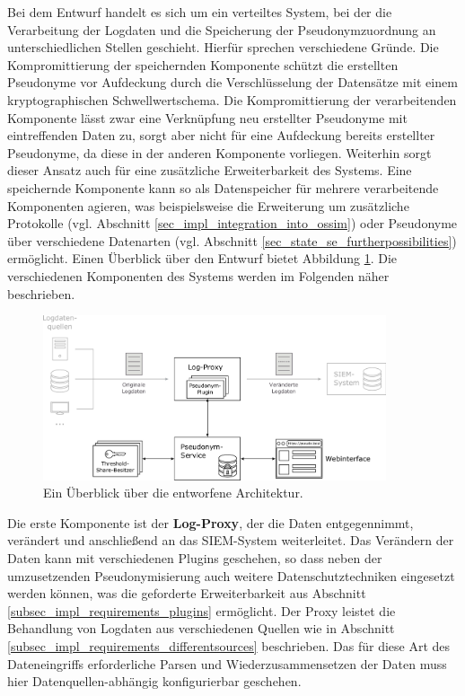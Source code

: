 Bei dem Entwurf handelt es sich um ein verteiltes System, bei der die Verarbeitung der Logdaten und die Speicherung der Pseudonymzuordnung an unterschiedlichen Stellen geschieht. Hierfür sprechen verschiedene Gründe. Die Kompromittierung der speichernden Komponente schützt die erstellten Pseudonyme vor Aufdeckung durch die Verschlüsselung der Datensätze mit einem kryptographischen Schwellwertschema. Die Kompromittierung der verarbeitenden Komponente lässt zwar eine Verknüpfung neu erstellter Pseudonyme mit eintreffenden Daten zu, sorgt aber nicht für eine Aufdeckung bereits erstellter Pseudonyme, da diese in der anderen Komponente vorliegen. Weiterhin sorgt dieser Ansatz auch für eine zusätzliche Erweiterbarkeit des Systems. Eine speichernde Komponente kann so als Datenspeicher für mehrere verarbeitende Komponenten agieren, was beispielsweise die Erweiterung um zusätzliche Protokolle (vgl. Abschnitt \ref{sec_impl_integration_into_ossim}) oder Pseudonyme über verschiedene Datenarten (vgl. Abschnitt \ref{sec_state_se_furtherpossibilities}) ermöglicht.
Einen Überblick über den Entwurf bietet Abbildung \ref{fig:high__level_architecture}. Die verschiedenen Komponenten des Systems werden im Folgenden näher beschrieben.

\begin{figure}[]
    \centering
        \includegraphics[width=0.9\textwidth]{dia/high_level_architecture.pdf}
    \caption{Ein Überblick über die entworfene Architektur.}
    \label{fig:high__level_architecture}
\end{figure}

Die erste Komponente ist der \textbf{Log-Proxy}, der die Daten entgegennimmt, verändert und anschließend an das SIEM-System weiterleitet. Das Verändern der Daten kann mit verschiedenen Plugins geschehen, so dass neben der umzusetzenden Pseudonymisierung auch weitere Datenschutztechniken eingesetzt werden können, was die geforderte Erweiterbarkeit aus Abschnitt \ref{subsec_impl_requirements_plugins} ermöglicht. Der Proxy leistet die Behandlung von Logdaten aus verschiedenen Quellen wie in Abschnitt \ref{subsec_impl_requirements_differentsources} beschrieben. Das für diese Art des Dateneingriffs erforderliche Parsen und Wiederzusammensetzen der Daten muss hier Datenquellen-abhängig konfigurierbar geschehen.

